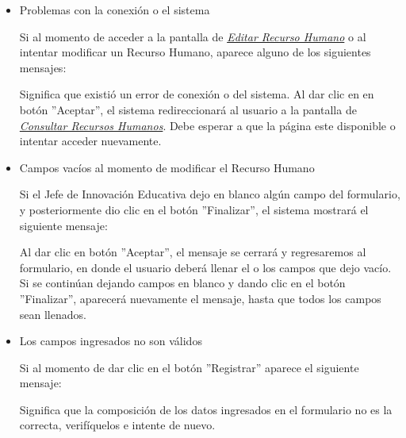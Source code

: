             \begin{itemize}
            	\item Problemas con la conexión o el sistema
            
                	Si al momento de acceder a la pantalla de \hyperlink{editarrh}{\textit{Editar Recurso Humano}} o al intentar modificar un Recurso Humano, aparece alguno de los siguientes mensajes:
            	    
            
                	Significa que existió un error de conexión o del sistema. Al dar clic en en botón ''Aceptar'', el sistema redireccionará al usuario a la pantalla de \hyperlink{consultarrh}{\textit{Consultar Recursos Humanos}}. Debe esperar a que la página este disponible o intentar acceder nuevamente.
            
            	\item Campos vacíos al momento de modificar el Recurso Humano
            
                	Si el Jefe de Innovación Educativa dejo en blanco algún campo del formulario, y posteriormente dio clic en el botón ''Finalizar'', el sistema mostrará el siguiente mensaje:
            	    
            
            	    Al dar clic en botón ''Aceptar'', el mensaje se cerrará y regresaremos al formulario, en donde el usuario deberá llenar el o los campos que dejo vacío. Si se continúan dejando campos en blanco y dando clic en el botón ''Finalizar'', aparecerá nuevamente el mensaje, hasta que todos los campos sean llenados.
            
            	\item Los campos ingresados no son válidos
            
                	Si al momento de dar clic en el botón ''Registrar'' aparece el siguiente mensaje:
            
                	Significa que la composición de los datos ingresados en el formulario no es la correcta, verifíquelos e intente de nuevo.
            
            \end{itemize}

